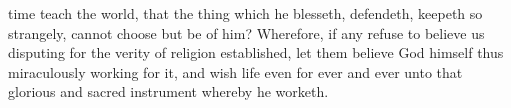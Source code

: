 time teach the world, that the thing which he blesseth, defendeth, keepeth so strangely, cannot choose but be of him? Wherefore, if any refuse to believe us disputing for the verity of religion established, let them believe God himself thus miraculously working for it, and wish life even for ever and ever unto that glorious and sacred instrument whereby he worketh.

